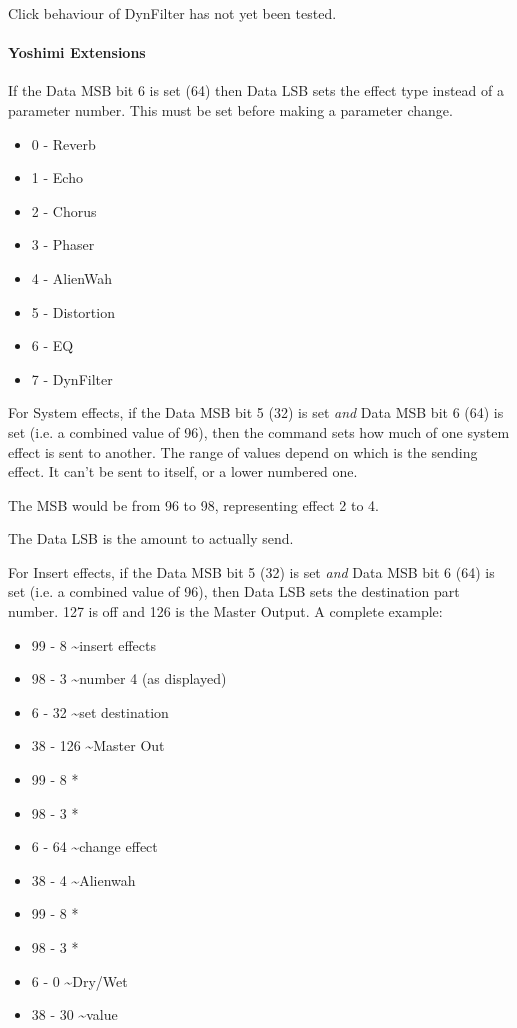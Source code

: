   Click behaviour of DynFilter has not yet been tested.

\paragraph{Yoshimi Extensions}

   If the Data MSB bit 6 is set (64) then Data LSB sets the effect type
   instead of a parameter number.  This must be set before making a parameter
   change.

   \begin{itemize}
      \item 0 - Reverb
      \item 1 - Echo
      \item 2 - Chorus
      \item 3 - Phaser
      \item 4 - AlienWah
      \item 5 - Distortion
      \item 6 - EQ
      \item 7 - DynFilter
   \end{itemize}


   For System effects, if the Data MSB bit 5 (32) is set
   \textsl{and} Data MSB bit 6 (64) is set (i.e. a combined value of 96),
   then the command sets how much of one system effect is sent to another.
   The range of values depend on which is the sending effect. It can't be sent to itself, or a lower numbered one.

   The MSB would be from 96 to 98, representing effect 2 to 4.

   The Data LSB is the amount to actually send.

   For Insert effects, if the Data MSB bit 5 (32) is set
   \textsl{and} Data MSB bit 6 (64) is set (i.e. a combined value of 96),
   then Data LSB sets the destination part number.
   127 is off and 126 is the Master Output.
   A complete example:

   \begin{itemize}
      \item 99 -   8 \textasciitilde insert effects
      \item 98 -   3 \textasciitilde number 4 (as displayed)
      \item 6 -  32 \textasciitilde set destination
      \item 38 - 126 \textasciitilde Master Out
      \item 99 -   8  *
      \item 98 -   3  *
      \item 6 -  64 \textasciitilde change effect
      \item 38 -   4 \textasciitilde Alienwah
      \item 99 -   8  *
      \item 98 -   3  *
      \item 6 -   0 \textasciitilde Dry/Wet
      \item 38 -  30 \textasciitilde value
   \end{itemize}

